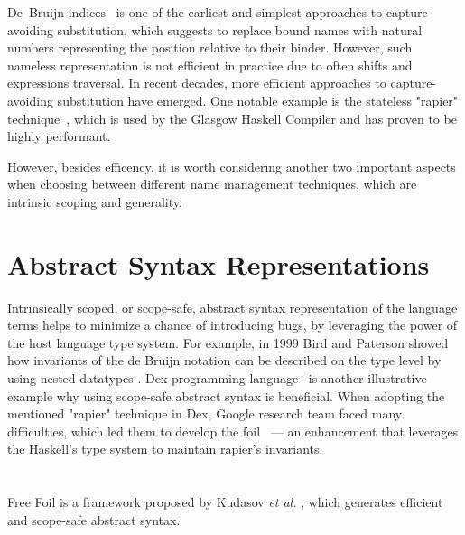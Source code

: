 De~Bruijn indices~\cite{deBruijn1972} is one of the earliest and simplest approaches to capture-avoiding substitution, which suggests to replace bound names with natural numbers representing the position relative to their binder. However, such nameless representation is not efficient in practice due to often shifts and expressions traversal. In recent decades, more efficient approaches to capture-avoiding substitution have emerged. One notable example is the stateless "rapier" technique~\cite{Simon2002_SecretsGHC}, which is used by the Glasgow Haskell Compiler and has proven to be highly performant. %

However, besides efficency, it is worth considering another two important aspects when choosing between different name management techniques, which are intrinsic scoping and generality.

\section{Abstract Syntax Representations}

Intrinsically scoped, or scope-safe, abstract syntax representation of the language terms helps to minimize a chance of introducing bugs, by leveraging the power of the host language type system. For example, in 1999 Bird and Paterson \cite{BirdPaterson1999_BruijnNested} showed how invariants of the de Bruijn notation can be described on the type level by using nested datatypes \cite{Bird1998_NestedDatatypes}. Dex programming language~\cite{PaszkeDex_2021} is another illustrative example why using scope-safe abstract syntax is beneficial. When adopting the mentioned "rapier" technique in Dex, Google research team faced many difficulties, which led them to develop the foil~\cite{Foil} — an enhancement that leverages the Haskell's type system to maintain rapier's invariants.


\section{}

Free Foil is a framework proposed by Kudasov \textit{et al.} \cite{FreeFoil}, which generates efficient and scope-safe abstract syntax.

